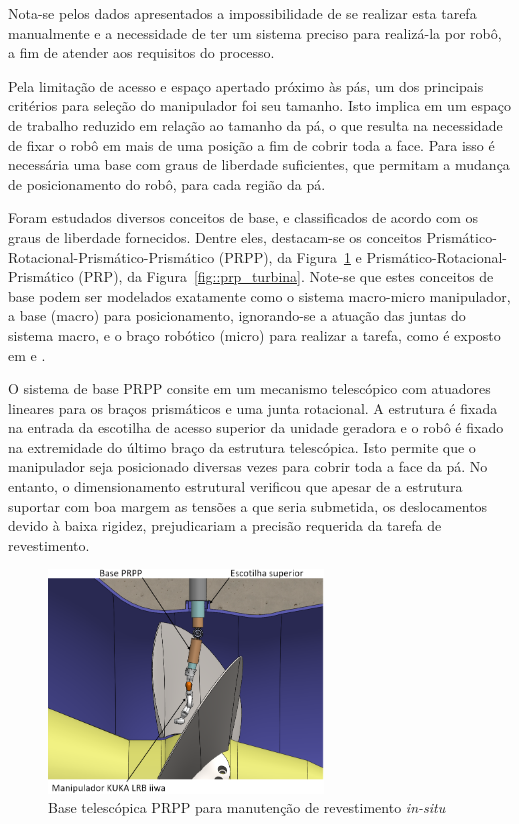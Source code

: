 Nota-se pelos dados apresentados a impossibilidade de se realizar esta tarefa
manualmente e a necessidade de ter um sistema preciso para realizá-la por robô,
a fim de atender aos requisitos do processo.

Pela limitação de acesso e espaço apertado próximo às pás, um dos principais
critérios para seleção do manipulador foi seu tamanho. Isto implica em um
espaço de trabalho reduzido em relação ao tamanho da pá, o que resulta na
necessidade de fixar o robô em mais de uma posição a fim de cobrir
toda a face. Para isso é necessária uma base com graus de liberdade suficientes,
que permitam a mudança de posicionamento do robô, para cada região da pá. 

Foram estudados diversos conceitos de base, e classificados de acordo com os
graus de liberdade fornecidos. Dentre eles, destacam-se os conceitos
Prismático-Rotacional-Prismático-Prismático (PRPP), da
Figura~\ref{fig::base_telesc_turbina} e Prismático-Rotacional-Prismático (PRP),
da Figura~\ref{fig::prp_turbina}. Note-se que estes conceitos de base podem ser
modelados exatamente como o sistema macro-micro manipulador, a base (macro) para
posicionamento, ignorando-se a atuação das juntas do sistema macro, e o braço
robótico (micro) para realizar a tarefa, como é exposto em
\cite{sharon1993macro} e \cite{lew1994bracing}.

O sistema de base PRPP consite em um mecanismo telescópico com atuadores
lineares para os braços prismáticos e uma junta rotacional. A estrutura é fixada
na entrada da escotilha de acesso superior da unidade geradora e o robô é fixado
na extremidade do último braço da estrutura telescópica. Isto permite que o
manipulador seja posicionado diversas vezes para cobrir toda a face da pá. No
entanto, o dimensionamento estrutural verificou que apesar de a estrutura
suportar com boa margem as tensões a que seria submetida, os deslocamentos
devido à baixa rigidez, prejudicariam a precisão requerida da tarefa de
revestimento.

\begin{figure}[h]
	\centering 
 	\includegraphics[width=0.65\textwidth]{figs/base_telesc_turbina}
 	\caption{Base telescópica PRPP para manutenção de revestimento
 	\textit{in-situ}}
 	\label{fig::base_telesc_turbina}
\end{figure}

